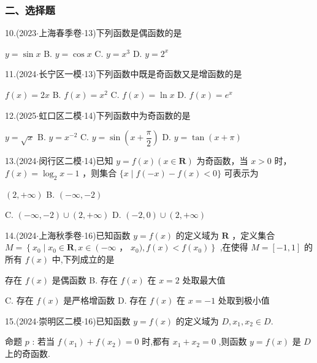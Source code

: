 \subsubsection*{二、选择题}

10.(2023$\cdot$上海春季卷$\cdot$13)下列函数是偶函数的是 \dotfill{(\kh{})}

\xx{}{}{}{}$y = \sin x$ B. $y = \cos x$ C. $y = {x}^{3}$ D. $y = {2}^{x}$

11.(2024$\cdot$长宁区一模$\cdot$13)下列函数中既是奇函数又是增函数的是 \dotfill{(\kh{})}

\xx{}{}{}{}$f\left( x\right)  = {2x}$ B. $f\left( x\right)  = {x}^{2}$ C. $f\left( x\right)  = \ln x$ D. $f\left( x\right)  = {{e}}^{x}$

12.(2025$\cdot$虹口区二模$\cdot$14)下列函数中为奇函数的是 \dotfill{(\kh{})}

\xx{}{}{}{}$y = \sqrt{x}$ B. $y = {x}^{-2}$ C. $y = \sin \left( {x + \dfrac{\pi }{2}}\right)$ D. $y = \tan \left( {x + \pi }\right)$

13.(2024$\cdot$闵行区二模$\cdot$14)已知 $y = f\left( x\right) \left( {x \in  \mathbf{R}}\right)$ 为奇函数，当 $x > 0$ 时， $f\left( x\right)  = {\log }_{2}x - 1$ ，则集合 $\{ x \mid  f\left( {-x}\right)  - f\left( x\right)  < 0\}$ 可表示为 \dotfill{(\kh{})}

\xx{}{}{}{}$\left( {2, + \infty }\right)$ B. $\left( {-\infty , - 2}\right)$

C. $\left( {-\infty , - 2}\right)  \cup  \left( {2, + \infty }\right)$ D. $\left( {-2,0}\right)  \cup  \left( {2, + \infty }\right)$

14.(2024$\cdot$上海秋季卷$\cdot$16)已知函数 $y = f\left( x\right)$ 的定义域为 $\mathbf{R}$ ，定义集合 $M = \left\{  {{x}_{0} \mid  {x}_{0} \in  \mathbf{R},x \in  \left( {-\infty }\right. }\right.$ ， $\left. {{x}_{0}),f\left( x\right)  < f\left( {x}_{0}\right) }\right\}$ ,在使得 $M = \left\lbrack  {-1,1}\right\rbrack$ 的所有 $f\left( x\right)$ 中,下列成立的是 \dotfill{(\kh{})}

\xx{}{}{}{}存在 $f\left( x\right)$ 是偶函数 B. 存在 $f\left( x\right)$ 在 $x = 2$ 处取最大值

C. 存在 $f\left( x\right)$ 是严格增函数 D. 存在 $f\left( x\right)$ 在 $x =  - 1$ 处取到极小值

15.(2024$\cdot$崇明区二模$\cdot$16)已知函数 $y = f\left( x\right)$ 的定义域为 $D,{x}_{1},{x}_{2} \in  D$.

命题 $p$ : 若当 $f\left( {x}_{1}\right)  + f\left( {x}_{2}\right)  = 0$ 时,都有 ${x}_{1} + {x}_{2} = 0$ ,则函数 $y = f\left( x\right)$ 是 $D$ 上的奇函数.

